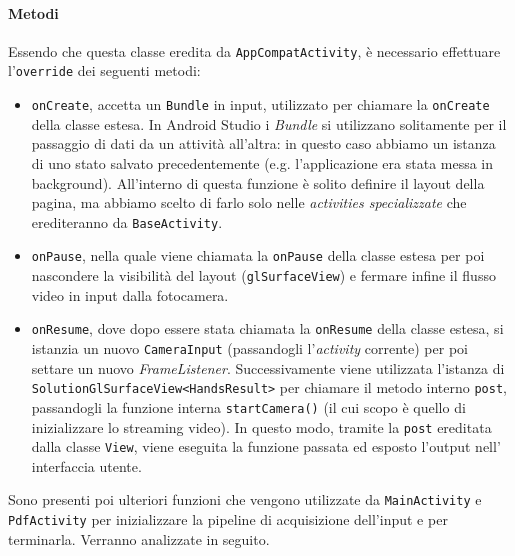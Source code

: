 \paragraph{Metodi} Essendo che questa classe eredita da \texttt{AppCompatActivity}, è necessario effettuare l'\texttt{override} dei seguenti metodi:
\begin{itemize}
    \item \texttt{onCreate}, accetta un \texttt{Bundle} in input, utilizzato per chiamare la \texttt{onCreate} della classe estesa. In Android Studio i \textit{Bundle} si utilizzano solitamente per il passaggio di dati da un attività all'altra: in questo caso abbiamo un istanza di uno stato salvato precedentemente (e.g. l'applicazione era stata messa in background). All'interno di questa funzione è solito definire il layout della pagina, ma abbiamo scelto di farlo solo nelle \textit{activities specializzate} che erediteranno da \texttt{BaseActivity}.
    \item \texttt{onPause}, nella quale viene chiamata la \texttt{onPause} della classe estesa per poi nascondere la visibilità del layout (\texttt{glSurfaceView}) e fermare infine il flusso video in input dalla fotocamera.
    \item \texttt{onResume}, dove dopo essere stata chiamata la \texttt{onResume} della classe estesa, si istanzia un nuovo \texttt{CameraInput} (passandogli l'\textit{activity} corrente) per poi settare un nuovo \textit{FrameListener}. Successivamente viene utilizzata l'istanza di \texttt{SolutionGlSurfaceView<HandsResult>} per chiamare il metodo interno \texttt{post}, passandogli la funzione interna \texttt{startCamera()} (il cui scopo è quello di inizializzare lo streaming video). In questo modo, tramite la \texttt{post} ereditata dalla classe \texttt{View}, viene eseguita la funzione passata ed esposto l'output nell' interfaccia utente.
\end{itemize}
\noindent Sono presenti poi ulteriori funzioni che vengono utilizzate da \texttt{MainActivity} e \\\texttt{PdfActivity} per inizializzare la pipeline di acquisizione dell'input e per terminarla. Verranno analizzate in seguito.


\newpage
